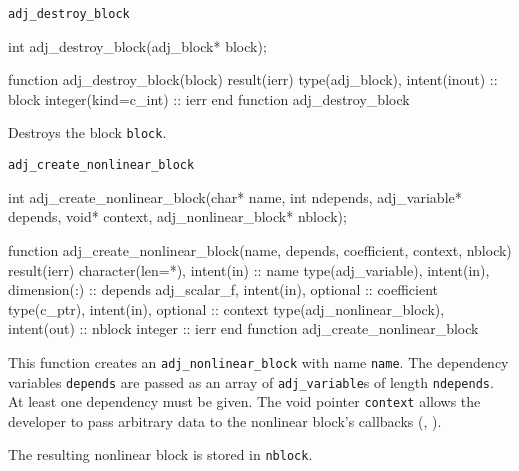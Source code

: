 \begin{boxwithtitle}{\texttt{adj_destroy_block}}
\begin{minipage}{\columnwidth}
\begin{ccode}
  int adj_destroy_block(adj_block* block);
\end{ccode}
\begin{fortrancode}
  function adj_destroy_block(block) result(ierr) 
    type(adj_block), intent(inout) :: block
    integer(kind=c_int) :: ierr
  end function adj_destroy_block
\end{fortrancode}
\end{minipage}
\end{boxwithtitle}

Destroys the block \texttt{block}.



\begin{boxwithtitle}{\texttt{adj_create_nonlinear_block}}
\begin{minipage}{\columnwidth}
\begin{ccode}
  int adj_create_nonlinear_block(char* name, int ndepends, adj_variable* depends, 
                                 void* context, adj_nonlinear_block* nblock);
\end{ccode}
\begin{fortrancode}
  function adj_create_nonlinear_block(name, depends, coefficient, context, nblock) 
           result(ierr)
    character(len=*), intent(in) :: name
    type(adj_variable), intent(in), dimension(:) :: depends
    adj_scalar_f, intent(in), optional :: coefficient
    type(c_ptr), intent(in), optional :: context
    type(adj_nonlinear_block), intent(out) :: nblock
    integer :: ierr
  end function adj_create_nonlinear_block
\end{fortrancode}
\end{minipage}
\end{boxwithtitle}

This function creates an \texttt{adj_nonlinear_block} with name \texttt{name}.
The dependency variables \texttt{depends} are passed as an array of \texttt{adj_variable}s of length \texttt{ndepends}.
At least one dependency must be given.
The void pointer \texttt{context} allows the developer to pass arbitrary data to the nonlinear block's callbacks (, ). 

The resulting nonlinear block is stored in \texttt{nblock}. 

